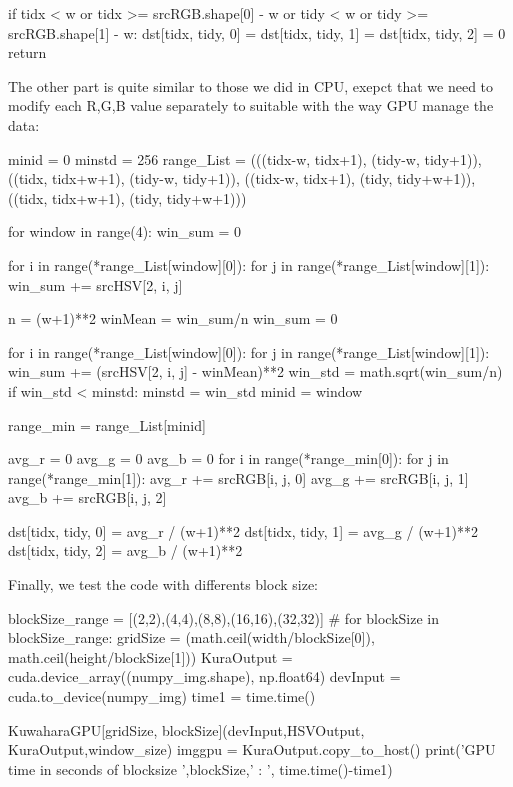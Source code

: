 \documentclass{article}
\begin{document}
\begin{python}
        if tidx < w or tidx >= srcRGB.shape[0] - w or tidy < w or tidy >= srcRGB.shape[1] - w:
            dst[tidx, tidy, 0] = dst[tidx, tidy, 1] = dst[tidx, tidy, 2] = 0
            return
\end{python}
The other part is quite similar to those we did in CPU, exepct that we need to modify each R,G,B value separately to suitable with the way GPU manage the data:

\begin{python}
        minid = 0
    minstd = 256
    range_List = (((tidx-w, tidx+1), (tidy-w, tidy+1)),
                ((tidx, tidx+w+1), (tidy-w, tidy+1)),
                ((tidx-w, tidx+1), (tidy, tidy+w+1)),
                ((tidx, tidx+w+1), (tidy, tidy+w+1)))

    for window in range(4):
        win_sum = 0

        for i in range(*range_List[window][0]):
            for j in range(*range_List[window][1]):
                win_sum += srcHSV[2, i, j]

        n = (w+1)**2
        winMean = win_sum/n
        win_sum = 0

        for i in range(*range_List[window][0]):
            for j in range(*range_List[window][1]):
                win_sum += (srcHSV[2, i, j] - winMean)**2 
        win_std = math.sqrt(win_sum/n)
        if win_std < minstd:
            minstd = win_std
            minid = window

    range_min = range_List[minid]

    avg_r = 0
    avg_g = 0
    avg_b = 0
    for i in range(*range_min[0]):
        for j in range(*range_min[1]):
            avg_r += srcRGB[i, j, 0]
            avg_g += srcRGB[i, j, 1]
            avg_b += srcRGB[i, j, 2]

    dst[tidx, tidy, 0] = avg_r / (w+1)**2
    dst[tidx, tidy, 1] = avg_g / (w+1)**2
    dst[tidx, tidy, 2] = avg_b / (w+1)**2
\end{python}


Finally, we test the code with differents block size:

\begin{python}
blockSize_range = [(2,2),(4,4),(8,8),(16,16),(32,32)] #
for blockSize in blockSize_range:
  gridSize = (math.ceil(width/blockSize[0]), math.ceil(height/blockSize[1]))
  KuraOutput = cuda.device_array((numpy_img.shape), np.float64)
  devInput = cuda.to_device(numpy_img)
  time1 = time.time()

  KuwaharaGPU[gridSize, blockSize](devInput,HSVOutput, KuraOutput,window_size)
  imggpu = KuraOutput.copy_to_host()
  print('GPU time in seconds of blocksize ',blockSize,' : ', time.time()-time1)
\end{python}
\end{document}
